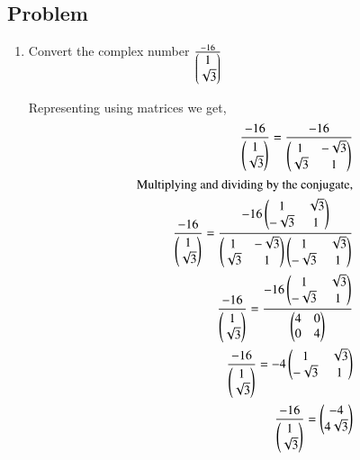 \subsection{Problem}
\renewcommand{\theequation}{\theenumi}
\begin{enumerate}[label=\thesection.\arabic*.,ref=\thesection.\theenumi]
\item Convert the complex number $\frac{-16}{\begin{pmatrix}1\\\sqrt{3}\end{pmatrix}}$

	\solution Representing using matrices we get,
	\begin{align}
		\frac{-16}{\begin{pmatrix}1\\\sqrt{3}\end{pmatrix}} = \frac{-16}{\begin{pmatrix}1&-\sqrt{3}\\\sqrt{3}&1\end{pmatrix}}\\
\text{Multiplying and dividing by the conjugate,}\\
		\frac{-16}{\begin{pmatrix}1\\\sqrt{3}\end{pmatrix}} = \frac{-16\begin{pmatrix}1&\sqrt{3}\\ -\sqrt{3}&1\end{pmatrix}}{\begin{pmatrix}1&-\sqrt{3}\\ \sqrt{3}&1\end{pmatrix}\begin{pmatrix}1&\sqrt{3}\\ -\sqrt{3}&1\end{pmatrix}}\\
		\frac{-16}{\begin{pmatrix}1\\\sqrt{3}\end{pmatrix}} = \frac{-16\begin{pmatrix}1&\sqrt{3}\\ -\sqrt{3}&1\end{pmatrix}}{\begin{pmatrix}4&0\\ 0&4\end{pmatrix}}\\
		\frac{-16}{\begin{pmatrix}1\\\sqrt{3}\end{pmatrix}} = -4\begin{pmatrix}1&\sqrt{3}\\-\sqrt{3}&1\end{pmatrix}\\
		\frac{-16}{\begin{pmatrix}1\\\sqrt{3}\end{pmatrix}} = \begin{pmatrix}-4\\4\sqrt{3}\end{pmatrix}
	\end{align}
\end{enumerate}
